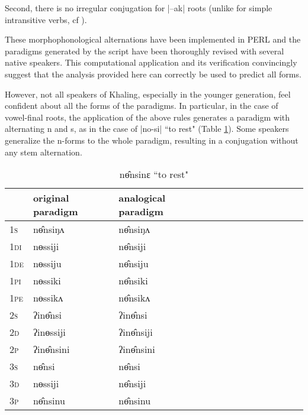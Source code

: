 \documentclass[twoside,a4paper,11pt]{article}
\newcommand{\ipa}[1]{{\phon#1}}
\newcommand{\grise}[1]{\cellcolor{lightgray}\textbf{#1}}
\begin{document}
Second, there is no irregular conjugation for |\ipa{--ak}| roots (unlike for simple intransitive verbs, cf \citealt[1115]{jacques12khaling}).

These morphophonological alternations have been implemented in PERL and the paradigms generated by the script have been thoroughly revised with several native speakers. This computational application and its  verification convincingly suggest that the analysis provided here can correctly be used to predict  all forms. 


However, not all speakers of Khaling, especially in the younger generation, feel confident about all the forms of the paradigms.  %
In particular, in the case of vowel-final roots, the application of the above rules generates a paradigm with alternating \ipa{n} and \ipa{s}, as in the case of |\ipa{no-si}| ``to rest" (Table \ref{tab:no}). Some speakers generalize the \ipa{n}-forms to the whole paradigm, resulting in a conjugation without any stem alternation.

\begin{table}[h]
 \centering 
\caption{ \ipa{nɵ̂nsinɛ}  ``to rest"  } \label{tab:no}
\begin{tabular}{l|l|l|l|l|l|l|l|l|l|l|l|l}  \toprule
&original paradigm& analogical paradigm \\
\midrule
\textsc{1s} & \ipa{nɵ̂nsiŋʌ} &\ipa{nɵ̂nsiŋʌ} \\ 
\textsc{1di} & \ipa{nɵssiji} &\ipa{nɵ̂nsiji} \grise{}  \\
\textsc{1de} & \ipa{nɵssiju} & \ipa{nɵ̂nsiju} \grise{}  \\ 
\textsc{1pi} & \ipa{nɵssiki} & \ipa{nɵ̂nsiki}  \grise{} \\ 
\textsc{1pe} & \ipa{nɵssikʌ} & \ipa{nɵ̂nsikʌ} \grise{}  \\ 
\textsc{2s} & \ipa{ʔinɵ̂nsi} & \ipa{ʔinɵ̂nsi}   \\ 
\textsc{2d} & \ipa{ʔinɵssiji} & \ipa{ʔinɵ̂nsiji}  \grise{}  \\
\textsc{2p} & \ipa{ʔinɵ̂nsini}  & \ipa{ʔinɵ̂nsini}    \\ 
\textsc{3s} & \ipa{nɵ̂nsi} & \ipa{nɵ̂nsi}   \\ 
\textsc{3d} & \ipa{nɵssiji} & \ipa{nɵ̂nsiji}  \grise{} \\ 
\textsc{3p} & \ipa{nɵ̂nsinu}  & \ipa{nɵ̂nsinu} \\ 
\bottomrule
\end{tabular}
\end{table}
\end{document}
